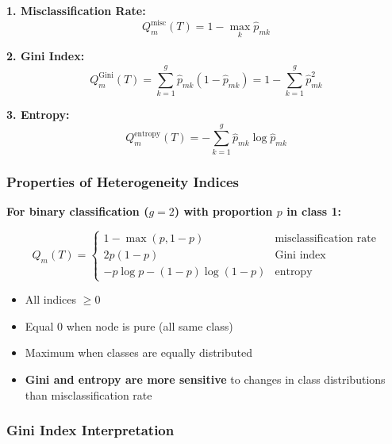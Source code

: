 \documentclass[12pt,a4paper]{article}
\begin{document}
\textbf{1. Misclassification Rate:}
\begin{equation}
Q_m^{\text{misc}}(T) = 1 - \max_k \hat{p}_{mk}
\end{equation}

\textbf{2. Gini Index:}
\begin{equation}
Q_m^{\text{Gini}}(T) = \sum_{k=1}^g \hat{p}_{mk}(1 - \hat{p}_{mk}) = 1 - \sum_{k=1}^g \hat{p}_{mk}^2
\end{equation}

\textbf{3. Entropy:}
\begin{equation}
Q_m^{\text{entropy}}(T) = -\sum_{k=1}^g \hat{p}_{mk} \log \hat{p}_{mk}
\end{equation}

\subsubsection{Properties of Heterogeneity Indices}

\textbf{For binary classification ($g = 2$) with proportion $p$ in class 1:}

\begin{equation}
Q_m(T) = \begin{cases}
1 - \max(p, 1-p) & \text{misclassification rate} \\
2p(1-p) & \text{Gini index} \\
-p \log p - (1-p) \log(1-p) & \text{entropy}
\end{cases}
\end{equation}

\begin{tcolorbox}[colback=green!5!white,colframe=green!75!black,title=Properties of Indices]
\begin{itemize}
    \item All indices $\geq 0$
    \item Equal 0 when node is pure (all same class)
    \item Maximum when classes are equally distributed
    \item \textbf{Gini and entropy are more sensitive} to changes in class distributions than misclassification rate
\end{itemize}
\end{tcolorbox}

\subsubsection{Gini Index Interpretation}
\end{document}
